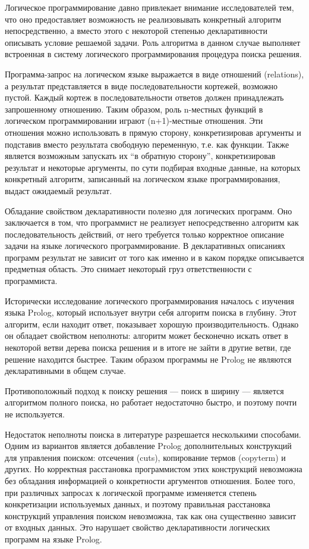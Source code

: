 
{\actuality}
Логическое программирование давно привлекает внимание исследователей тем, что оно предоставляет возможность не реализовывать конкретный алгоритм непосредственно, а вместо этого с некоторой степенью декларативности описывать условие решаемой задачи. Роль алгоритма в данном случае выполняет встроенная в систему логического программирования процедура поиска решения.

Программа-запрос на логическом языке выражается в виде отношений (relations), а результат представляется в виде последовательности кортежей, возможно пустой.
Каждый кортеж в последовательности ответов должен принадлежать запрошенному отношению. Таким образом, роль n-местных функций в логическом программировании играют (n+1)-местные отношения. Эти отношения можно использовать в прямую сторону, конкретизировав аргументы и подставив вместо результата свободную переменную, т.е. как функции. Также является возможным запускать их ``в обратную сторону'', конкретизировав результат и некоторые аргументы, по сути подбирая входные данные, на которых конкретный алгоритм, записанный на логическом языке программирования, выдаст ожидаемый результат.

Обладание свойством декларативности полезно для логических программ. Оно заключается в том, что программист не реализует непосредственно алгоритм как последовательность действий, от него требуется только корректное описание задачи на языке логического программирование. В декларативных описаниях программ результат не зависит от того как именно и в каком порядке описывается предметная область. Это снимает некоторый груз ответственности с программиста. 

Исторически исследование логического программирования началось с изучения языка Prolog, который использует внутри себя  алгоритм поиска в глубину. Этот алгоритм, если находит ответ, показывает хорошую производительность. Однако он обладает свойством неполноты: алгоритм может бесконечно искать ответ в некоторой ветви дерева поиска решения и в итоге не зайти в другие ветви, где решение находится быстрее. Таким образом программы не Prolog не являются декларативными в общем случае.

Противоположный подход к поиску решения --- поиск в ширину --- является алгоритмом полного поиска, но работает недостаточно быстро, и поэтому почти не используется.

Недостаток неполноты поиска в литературе разрешается несколькими способами. Одним из вариантов является добавление Prolog дополнительных конструкций для управления поиском: отсечения (cuts), копирование термов (copyterm) и других. Но корректная расстановка программистом этих конструкций невозможна без обладания информацией о конкретности аргументов отношения. Более того, при различных запросах к логической программе изменяется степень конкретизации используемых данных, и поэтому правильная расстановка конструкций управления поиском невозможна, так как она существенно зависит от входных данных. Это нарушает свойство декларативности логических программ на языке Prolog.

